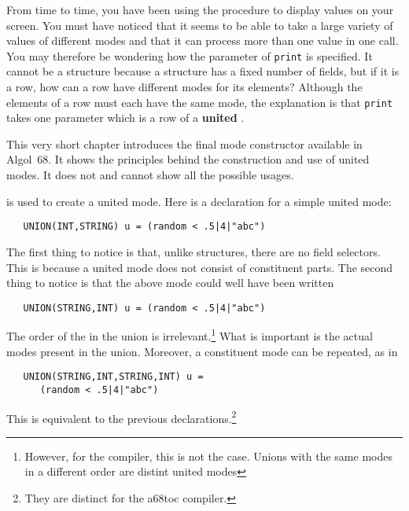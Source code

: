%
From time to time, you have been using the procedure  to
display values on your screen. You must have noticed that it seems to
be able to take a large variety of values of different modes and that
it can process more than one value in one call. You may therefore be
wondering how the parameter of \verb|print| is specified. It cannot
be a structure because a structure has a fixed number of fields, but
if it is a row, how can a row have different modes for its elements?
Although the elements of a row must each have the same mode, the
explanation is that \verb|print| takes one parameter which is a row
of a \textbf{united} .

This very short chapter introduces the final mode constructor available
in Algol~68. It shows the principles behind the construction and use of
united modes. It does not and cannot show all the possible usages.

 is used to create a united mode. Here is a declaration
for a simple united mode:
\begin{verbatim}
   UNION(INT,STRING) u = (random < .5|4|"abc")
\end{verbatim}
\noindent
The first thing to notice is that, unlike structures, there are no
field selectors.  This is because a united mode does not consist of
constituent parts. The second thing to notice is that the above mode
could well have been written
\begin{verbatim}
   UNION(STRING,INT) u = (random < .5|4|"abc")
\end{verbatim}
\noindent
The order of the  in the union is
irrelevant.\footnote{However, for the
\protect{} compiler, this is
not the case. Unions with the same modes in a different order are distint united modes}
What is important is the actual modes present in the
union. Moreover, a constituent mode can be repeated, as in
\begin{verbatim}
   UNION(STRING,INT,STRING,INT) u =
      (random < .5|4|"abc")
\end{verbatim}
\noindent
This is equivalent to the previous declarations.\footnote{They are distinct
for the a68toc compiler.}

